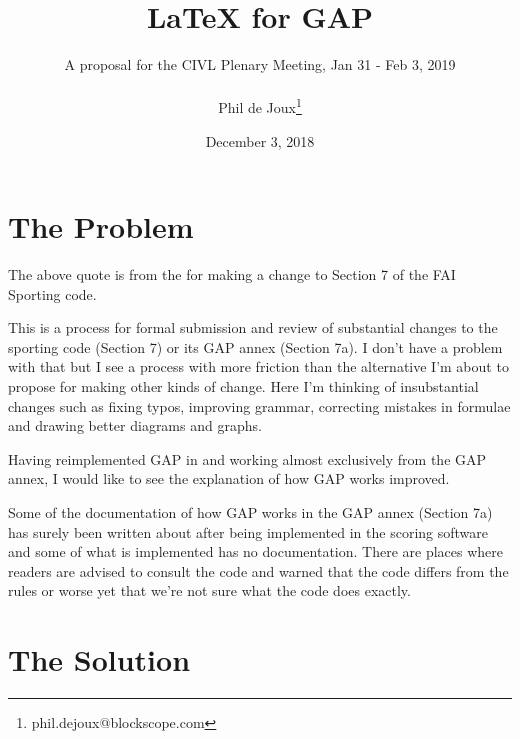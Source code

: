 \documentclass{article}
\title{LaTeX for GAP}
\date{December 3, 2018}
\author{A proposal for the CIVL Plenary Meeting, Jan 31 - Feb 3, 2019\\\\
Phil de Joux\thanks{phil.dejoux@blockscope.com}}
\begin{document}
\maketitle
\section{The Problem}


The above quote is from the
 for making a change to Section 7 of the FAI Sporting code.

This is a process for formal submission and review of substantial changes to
the sporting code (Section 7) or its GAP annex (Section 7a). I don't have
a problem with that but I see a process with more friction than the alternative
I'm about to propose for making other kinds of change. Here I'm thinking of
insubstantial changes such as fixing typos, improving grammar, correcting
mistakes in formulae and drawing better diagrams and graphs.

Having reimplemented GAP in
 and working
almost exclusively from the GAP annex, I would like to see the explanation of
how GAP works improved.

Some of the documentation of how GAP works in the GAP annex (Section 7a) has
surely been written about after being implemented in the scoring software and
some of what is implemented has no documentation.  There are places where
readers are advised to consult the code and warned that the code differs from
the rules or worse yet that we're not sure what the code does exactly.

\section{The Solution}
\end{document}
